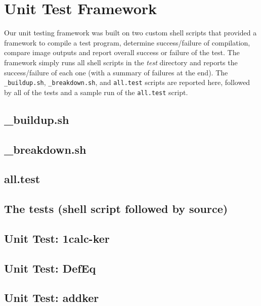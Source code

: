 \section{Unit Test Framework}
Our unit testing framework was built on two custom shell scripts that provided
a framework to compile a test program, determine success/failure of compilation,
compare image outputs and report overall success or failure of the test.
The framework simply runs all shell scripts in the \emph{test} directory and
reports the success/failure of each one (with a summary of failures at the end).
The \texttt{_buildup.sh}, \texttt{_breakdown.sh}, and \texttt{all.test} scripts are
reported here, followed by all of the tests and a sample run of the
\texttt{all.test} script.
\vskip -4mm

\vskip -4mm
\subsection*{_buildup.sh}
\vskip -2mm
 \clearpage
\subsection*{_breakdown.sh}

\subsection*{all.test}
 \clearpage
\subsection*{The tests (shell script followed by \sys{} source)}
\subsection*{Unit Test: 1calc-ker}

 \clearpage
\subsection*{Unit Test: DefEq}

 \clearpage
\subsection*{Unit Test: addker}

 \clearpage
